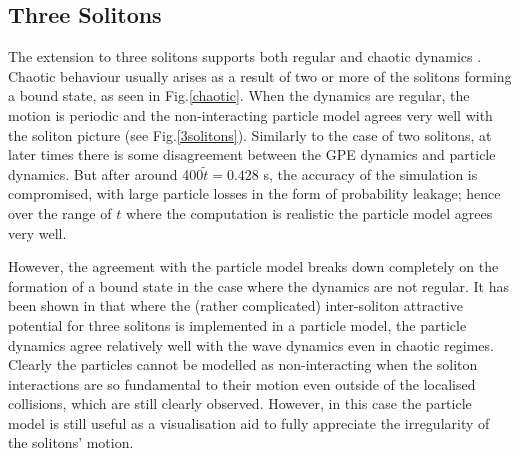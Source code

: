 \documentclass[10pt, twocolumn]{revtex4}    %
\begin{document}

\subsection{Three Solitons}

The extension to three solitons supports both regular and chaotic dynamics \cite{Gardiner}. Chaotic behaviour usually arises as a result of two or more of the solitons forming a bound state, as seen in Fig.\ref{chaotic}. When the dynamics are regular, the motion is periodic and the non-interacting particle model agrees very well with the soliton picture (see Fig.\ref{3solitons}). Similarly to the case of two solitons, at later times there is some disagreement between the GPE dynamics and particle dynamics. But after around 400$\tilde{t} = 0.428$ s, the accuracy of the simulation is compromised, with large particle losses in the form of probability leakage; hence over the range of $t$ where the computation is realistic the particle model agrees very well. 

However, the agreement with the particle model breaks down completely on the formation of a bound state in the case where the dynamics are not regular. It has been shown in \cite{Martin} that where the (rather complicated) inter-soliton attractive potential for three solitons is implemented in a particle model, the particle dynamics agree relatively well with the wave dynamics even in chaotic regimes. Clearly the particles cannot be modelled as non-interacting when the soliton interactions are so fundamental to their motion even outside of the localised collisions, which are still clearly observed. However, in this case the particle model is still useful as a visualisation aid to fully appreciate the irregularity of the solitons' motion. 
\end{document}
